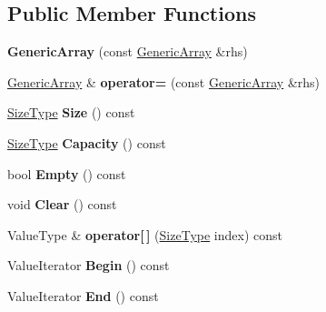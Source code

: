 \subsection*{Public Member Functions}
\begin{DoxyCompactItemize}
\item 
\mbox{\label{class_generic_array_aa589d897a194b349d5053391a6f1491d}} 
{\bfseries Generic\+Array} (const \hyperlink{class_generic_array}{Generic\+Array} \&rhs)
\item 
\mbox{\label{class_generic_array_addbff152092d0998b2c550bd575f4b83}} 
\hyperlink{class_generic_array}{Generic\+Array} \& {\bfseries operator=} (const \hyperlink{class_generic_array}{Generic\+Array} \&rhs)
\item 
\mbox{\label{class_generic_array_a62d5b7f423edc2141cd4524c7dfd138b}} 
\hyperlink{rapidjson_8h_a5ed6e6e67250fadbd041127e6386dcb5}{Size\+Type} {\bfseries Size} () const
\item 
\mbox{\label{class_generic_array_ab385434ab7a99de7a0a17e5ee7e09d7f}} 
\hyperlink{rapidjson_8h_a5ed6e6e67250fadbd041127e6386dcb5}{Size\+Type} {\bfseries Capacity} () const
\item 
\mbox{\label{class_generic_array_af09e3aaeaeeb5fd825d79cc6663dfcf5}} 
bool {\bfseries Empty} () const
\item 
\mbox{\label{class_generic_array_a5e6c158ff76ab8a8ed568fa486e63c80}} 
void {\bfseries Clear} () const
\item 
\mbox{\label{class_generic_array_aa185d997e7787e9b4f624d5de592b886}} 
Value\+Type \& {\bfseries operator\mbox{[}$\,$\mbox{]}} (\hyperlink{rapidjson_8h_a5ed6e6e67250fadbd041127e6386dcb5}{Size\+Type} index) const
\item 
\mbox{\label{class_generic_array_a3efaa020b29ceed9c1a03465676a32a7}} 
Value\+Iterator {\bfseries Begin} () const
\item 
\mbox{\label{class_generic_array_a396f83d328f4879225106ea14b1dca84}} 
Value\+Iterator {\bfseries End} () const

\end{DoxyCompactItemize}
